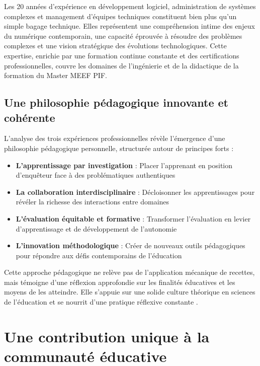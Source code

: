 \documentclass[12pt,a4paper]{report}
\begin{document}
Les 20 années d'expérience en développement logiciel, administration de systèmes complexes et management d'équipes techniques constituent bien plus qu'un simple bagage technique. Elles représentent une compréhension intime des enjeux du numérique contemporain, une capacité éprouvée à résoudre des problèmes complexes et une vision stratégique des évolutions technologiques. Cette expertise, enrichie par une formation continue constante et des certifications professionnelles, couvre les domaines de l'ingénierie et de la didactique de la formation du Master MEEF PIF.

\subsection*{Une philosophie pédagogique innovante et cohérente}

L'analyse des trois expériences professionnelles révèle l'émergence d'une philosophie pédagogique personnelle, structurée autour de principes forts :

\begin{itemize}[leftmargin=*]
    \item \textbf{L'apprentissage par investigation} : Placer l'apprenant en position d'enquêteur face à des problématiques authentiques
    \item \textbf{La collaboration interdisciplinaire} : Décloisonner les apprentissages pour révéler la richesse des interactions entre domaines
    \item \textbf{L'évaluation équitable et formative} : Transformer l'évaluation en levier d'apprentissage et de développement de l'autonomie
    \item \textbf{L'innovation méthodologique} : Créer de nouveaux outils pédagogiques pour répondre aux défis contemporains de l'éducation
\end{itemize}

Cette approche pédagogique ne relève pas de l'application mécanique de recettes, mais témoigne d'une réflexion approfondie sur les finalités éducatives et les moyens de les atteindre. Elle s'appuie sur une solide culture théorique en sciences de l'éducation et se nourrit d'une pratique réflexive constante \parencite{schon_reflective_practitioner}.

\section*{Une contribution unique à la communauté éducative}
\end{document}
